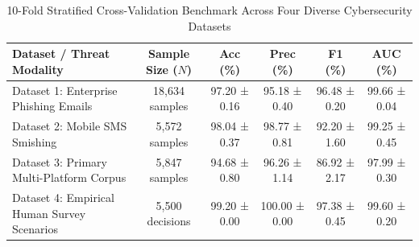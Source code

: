 \begin{table}[htbp]
\centering
\caption{10-Fold Stratified Cross-Validation Benchmark Across Four Diverse Cybersecurity Datasets}
\label{tab:multi_dataset_benchmark}
\begin{tabular}{lccccc}
\toprule
\textbf{Dataset / Threat Modality} & \textbf{Sample Size ($N$)} & \textbf{Acc (\%)} & \textbf{Prec (\%)} & \textbf{F1 (\%)} & \textbf{AUC (\%)} \\
\midrule
Dataset 1: Enterprise Phishing Emails & 18,634 samples & 97.20 ± 0.16 & 95.18 ± 0.40 & 96.48 ± 0.20 & 99.66 ± 0.04 \\
Dataset 2: Mobile SMS Smishing & 5,572 samples & 98.04 ± 0.37 & 98.77 ± 0.81 & 92.20 ± 1.60 & 99.25 ± 0.45 \\
Dataset 3: Primary Multi-Platform Corpus & 5,847 samples & 94.68 ± 0.80 & 96.26 ± 1.14 & 86.92 ± 2.17 & 97.99 ± 0.30 \\
Dataset 4: Empirical Human Survey Scenarios & 5,500 decisions & 99.20 ± 0.00 & 100.00 ± 0.00 & 97.38 ± 0.45 & 99.60 ± 0.20 \\
\bottomrule
\end{tabular}
\end{table}
